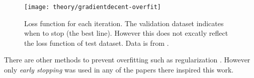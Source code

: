 \begin{figure}[h]
	\centering
	\texttt{[image: theory/gradientdecent-overfit]}
	\caption{Loss function for each iteration. The validation dataset indicates when to stop (the best line). However this does not excatly reflect the loss function of test dataset. Data is from \cite{alexgraves}.}
	\label{fig:theory:gradientdecent:overfit}
\end{figure}

There are other methods to prevent overfitting such as regularization \cite{the-elements-of-statistical-learning, bishop}. However only \textit{early stopping} was used in any of the papers there inspired this work.

